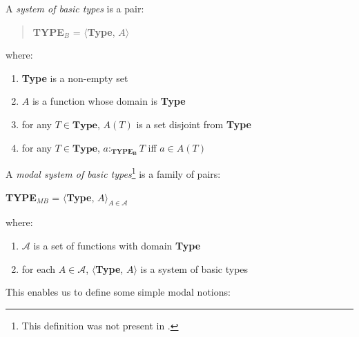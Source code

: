 A {\it system of basic types\/} is a pair:
\begin{quote}
{\bf TYPE$_B$} = $\langle${\bf Type}, $A$$\rangle$
\end{quote}
where:
\begin{enumerate} 
 
\item \textbf{Type} is a non-empty set 
 
\item $A$ is a function whose domain is \textbf{Type}

\item for any $T\in\textbf{Type}$, $A(T)$ is a set disjoint from
  \textbf{Type}

\item for any $T\in\textbf{Type}$, $a:_{\mathbf{TYPE_B}}T$ iff $a\in A(T)$
 
\end{enumerate}


A \textit{modal system of basic types}\footnote{This definition was not present in \cite{Cooper2012}.} is a family of
pairs:
\begin{display}
\textbf{TYPE$_{\mathit{MB}}$} = $\langle${\bf Type},
$A\rangle_{A\in\mathcal{A}}$
\end{display}
where:
\begin{enumerate} 
 
\item $\mathcal{A}$ is a set of functions with domain \textbf{Type} 
 
\item for each $A\in\mathcal{A}$, $\langle${\bf Type}, $A\rangle$ is a
  system of basic types
 
\end{enumerate} 

This enables us to define some simple modal notions:

